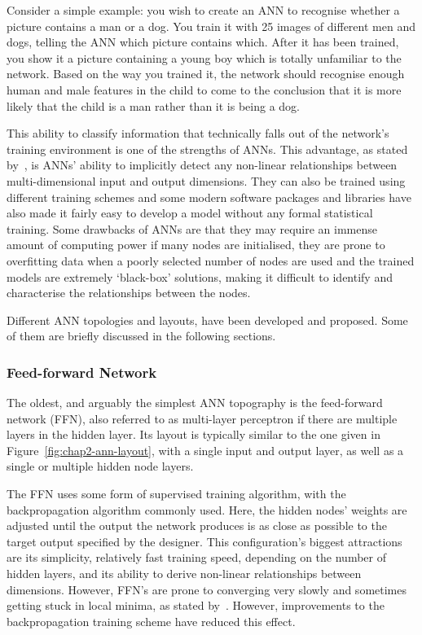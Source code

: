 Consider a simple example: you wish to create an ANN to recognise whether a picture contains a man or a dog. You train it with 25 images of different men and dogs, telling the ANN which picture contains which. After it has been trained, you show it a picture containing a young boy which is totally unfamiliar to the network. Based on the way you trained it, the network should recognise enough human and male features in the child to come to the conclusion that it is more likely that the child is a man rather than it is being a dog. 

This ability to classify information that technically falls out of the network's training environment is one of the strengths of ANNs. This advantage, as stated by~\cite{tu1996advantages}, is ANNs' ability to implicitly detect any non-linear relationships between multi-dimensional input and output dimensions. They can also be trained using different training schemes and some modern software packages and libraries have also made it fairly easy to develop a model without any formal statistical training. Some drawbacks of ANNs are that they may require an immense amount of computing power if many nodes are initialised, they are prone to overfitting data when a poorly selected number of nodes are used and the trained models are extremely `black-box' solutions, making it difficult to identify and characterise the relationships between the nodes. 

Different ANN topologies and layouts, have been developed and proposed. Some of them are briefly discussed in the following sections.

\subsubsection{Feed-forward Network}

The oldest, and arguably the simplest ANN topography is the feed-forward network (FFN), also referred to as multi-layer perceptron if there are multiple layers in the hidden layer. Its layout is typically similar to the one given in Figure~\ref{fig:chap2-ann-layout}, with a single input and output layer, as well as a single or multiple hidden node layers. 

The FFN uses some form of supervised training algorithm, with the backpropagation algorithm commonly used. Here, the hidden nodes' weights are adjusted until the output the network produces is as close as possible to the target output specified by the designer. This configuration's biggest attractions are its simplicity, relatively fast training speed, depending on the number of hidden layers, and its ability to derive non-linear relationships between dimensions. However, FFN's are prone to converging very slowly and sometimes getting stuck in local minima, as stated by~\cite{svozil1997introduction}. However, improvements to the backpropagation training scheme have reduced this effect.

